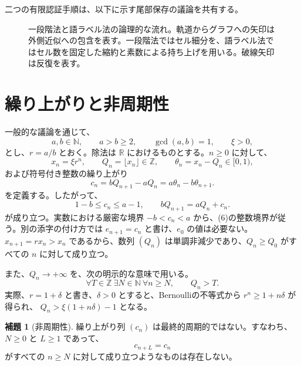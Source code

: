 \documentclass[11pt,reqno]{amsart}
\theoremstyle{definition}
\newtheorem{lemma}[theorem]{補題}
\theoremstyle{definition}
\theoremstyle{remark}
\begin{document}
二つの有限認証手順は、以下に示す尾部保存の議論を共有する。

\begin{figure}[htbp]
\centering

\caption{一段階法と語ラベル法の論理的な流れ。軌道からグラフへの矢印は外側近似への包含を表す。一段階法ではセル細分を、語ラベル法ではセル数を固定した縮約と素数による持ち上げを用いる。破線矢印は反復を表す。}
\label{fig:certificate-flow}
\end{figure}

\section{繰り上がりと非周期性}\label{sec:2}

一般的な議論を通じて、
\[
a,b\in\mathbb N,\qquad a>b\ge2,\qquad \gcd(a,b)=1,\qquad \xi>0,
\]
とし、\(r=a/b\) とおく。除法は \(\mathbb R\) におけるものとする。\(n\ge0\) に対して、
\[
x_n=\xi r^n,\qquad Q_n=\lfloor x_n\rfloor\in\mathbb Z,
\qquad \theta_n=x_n-Q_n\in[0,1),
\tag{4}\label{eq:4}
\]
および符号付き整数の繰り上がり
\[
c_n=bQ_{n+1}-aQ_n=a\theta_n-b\theta_{n+1}.
\tag{5}\label{eq:5}
\]
を定義する。したがって、
\[
1-b\le c_n\le a-1,\qquad bQ_{n+1}=aQ_n+c_n.
\tag{6}\label{eq:6}
\]
が成り立つ。実数における厳密な境界 \(-b<c_n<a\) から、(6)の整数境界が従う。別の添字の付け方では \(e_{n+1}=c_n\) と書け、\(e_0\) の値は必要ない。\(x_{n+1}=rx_n>x_n\) であるから、数列 \((Q_n)\) は単調非減少であり、\(Q_n\ge Q_0\) がすべての \(n\) に対して成り立つ。

また、\(Q_n\to+\infty\) を、次の明示的な意味で用いる。
\[
\forall T\in\mathbb Z\ \exists N\in\mathbb N\ \forall n\ge N,
\qquad Q_n>T.
\tag{7}\label{eq:7}
\]
実際、\(r=1+\delta\) と書き、\(\delta>0\) とすると、Bernoulliの不等式から \(r^n\ge1+n\delta\) が得られ、
\(Q_n>\xi(1+n\delta)-1\)
となる。

\begin{samepage}
\begin{lemma}[非周期性]\leavevmode\label{thm:4}
繰り上がり列 \((c_n)\) は最終的周期的ではない。すなわち、\(N\ge0\) と \(L\ge1\) であって、
\[
c_{n+L}=c_n
\]
がすべての \(n\ge N\) に対して成り立つようなものは存在しない。
\label{thm-end:4}
\end{lemma}
\end{samepage}
\end{document}

